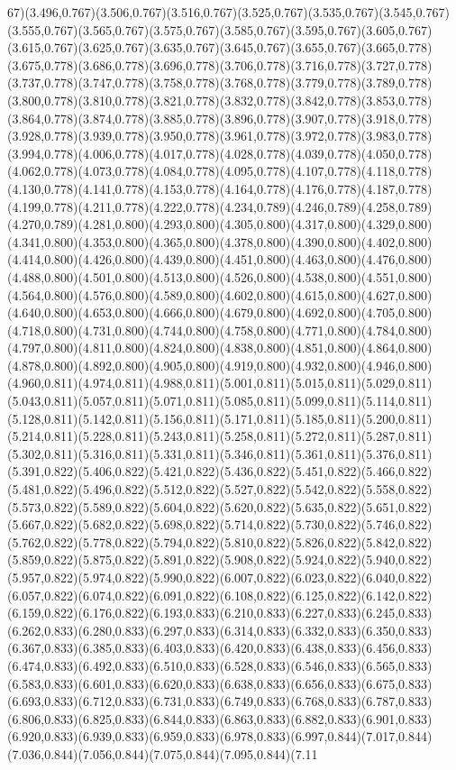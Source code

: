 \documentclass[smallextended]{svjour3}
\begin{document}
67)(3.496,0.767)(3.506,0.767)(3.516,0.767)(3.525,0.767)(3.535,0.767)(3.545,0.767)(3.555,0.767)(3.565,0.767)(3.575,0.767)(3.585,0.767)(3.595,0.767)(3.605,0.767)(3.615,0.767)(3.625,0.767)(3.635,0.767)(3.645,0.767)(3.655,0.767)(3.665,0.778)(3.675,0.778)(3.686,0.778)(3.696,0.778)(3.706,0.778)(3.716,0.778)(3.727,0.778)(3.737,0.778)(3.747,0.778)(3.758,0.778)(3.768,0.778)(3.779,0.778)(3.789,0.778)(3.800,0.778)(3.810,0.778)(3.821,0.778)(3.832,0.778)(3.842,0.778)(3.853,0.778)(3.864,0.778)(3.874,0.778)(3.885,0.778)(3.896,0.778)(3.907,0.778)(3.918,0.778)(3.928,0.778)(3.939,0.778)(3.950,0.778)(3.961,0.778)(3.972,0.778)(3.983,0.778)(3.994,0.778)(4.006,0.778)(4.017,0.778)(4.028,0.778)(4.039,0.778)(4.050,0.778)(4.062,0.778)(4.073,0.778)(4.084,0.778)(4.095,0.778)(4.107,0.778)(4.118,0.778)(4.130,0.778)(4.141,0.778)(4.153,0.778)(4.164,0.778)(4.176,0.778)(4.187,0.778)(4.199,0.778)(4.211,0.778)(4.222,0.778)(4.234,0.789)(4.246,0.789)(4.258,0.789)(4.270,0.789)(4.281,0.800)(4.293,0.800)(4.305,0.800)(4.317,0.800)(4.329,0.800)(4.341,0.800)(4.353,0.800)(4.365,0.800)(4.378,0.800)(4.390,0.800)(4.402,0.800)(4.414,0.800)(4.426,0.800)(4.439,0.800)(4.451,0.800)(4.463,0.800)(4.476,0.800)(4.488,0.800)(4.501,0.800)(4.513,0.800)(4.526,0.800)(4.538,0.800)(4.551,0.800)(4.564,0.800)(4.576,0.800)(4.589,0.800)(4.602,0.800)(4.615,0.800)(4.627,0.800)(4.640,0.800)(4.653,0.800)(4.666,0.800)(4.679,0.800)(4.692,0.800)(4.705,0.800)(4.718,0.800)(4.731,0.800)(4.744,0.800)(4.758,0.800)(4.771,0.800)(4.784,0.800)(4.797,0.800)(4.811,0.800)(4.824,0.800)(4.838,0.800)(4.851,0.800)(4.864,0.800)(4.878,0.800)(4.892,0.800)(4.905,0.800)(4.919,0.800)(4.932,0.800)(4.946,0.800)(4.960,0.811)(4.974,0.811)(4.988,0.811)(5.001,0.811)(5.015,0.811)(5.029,0.811)(5.043,0.811)(5.057,0.811)(5.071,0.811)(5.085,0.811)(5.099,0.811)(5.114,0.811)(5.128,0.811)(5.142,0.811)(5.156,0.811)(5.171,0.811)(5.185,0.811)(5.200,0.811)(5.214,0.811)(5.228,0.811)(5.243,0.811)(5.258,0.811)(5.272,0.811)(5.287,0.811)(5.302,0.811)(5.316,0.811)(5.331,0.811)(5.346,0.811)(5.361,0.811)(5.376,0.811)(5.391,0.822)(5.406,0.822)(5.421,0.822)(5.436,0.822)(5.451,0.822)(5.466,0.822)(5.481,0.822)(5.496,0.822)(5.512,0.822)(5.527,0.822)(5.542,0.822)(5.558,0.822)(5.573,0.822)(5.589,0.822)(5.604,0.822)(5.620,0.822)(5.635,0.822)(5.651,0.822)(5.667,0.822)(5.682,0.822)(5.698,0.822)(5.714,0.822)(5.730,0.822)(5.746,0.822)(5.762,0.822)(5.778,0.822)(5.794,0.822)(5.810,0.822)(5.826,0.822)(5.842,0.822)(5.859,0.822)(5.875,0.822)(5.891,0.822)(5.908,0.822)(5.924,0.822)(5.940,0.822)(5.957,0.822)(5.974,0.822)(5.990,0.822)(6.007,0.822)(6.023,0.822)(6.040,0.822)(6.057,0.822)(6.074,0.822)(6.091,0.822)(6.108,0.822)(6.125,0.822)(6.142,0.822)(6.159,0.822)(6.176,0.822)(6.193,0.833)(6.210,0.833)(6.227,0.833)(6.245,0.833)(6.262,0.833)(6.280,0.833)(6.297,0.833)(6.314,0.833)(6.332,0.833)(6.350,0.833)(6.367,0.833)(6.385,0.833)(6.403,0.833)(6.420,0.833)(6.438,0.833)(6.456,0.833)(6.474,0.833)(6.492,0.833)(6.510,0.833)(6.528,0.833)(6.546,0.833)(6.565,0.833)(6.583,0.833)(6.601,0.833)(6.620,0.833)(6.638,0.833)(6.656,0.833)(6.675,0.833)(6.693,0.833)(6.712,0.833)(6.731,0.833)(6.749,0.833)(6.768,0.833)(6.787,0.833)(6.806,0.833)(6.825,0.833)(6.844,0.833)(6.863,0.833)(6.882,0.833)(6.901,0.833)(6.920,0.833)(6.939,0.833)(6.959,0.833)(6.978,0.833)(6.997,0.844)(7.017,0.844)(7.036,0.844)(7.056,0.844)(7.075,0.844)(7.095,0.844)(7.11
\end{document}
